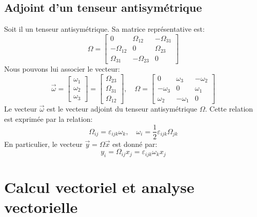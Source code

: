 \subsection{Adjoint d'un tenseur antisymétrique}
Soit il  un tenseur antisymétrique.
Sa matrice représentative est:
\begin{equation}
    \mathbb{\Omega} = 
    \begin{bmatrix}
        0 & \Omega_{12} & -\Omega_{31} \\
        -\Omega_{12} & 0 & \Omega_{23} \\
        \Omega_{31} & -\Omega_{23} & 0
    \end{bmatrix}
    \label{eq:AnnA-046}
\end{equation}
Nous pouvons lui associer le vecteur:
\begin{equation}
    \vec{\omega} = 
    \begin{bmatrix}
        \omega_1 \\
        \omega_2 \\
        \omega_3
    \end{bmatrix} =
    \begin{bmatrix}
        \Omega_{23} \\
        \Omega_{31} \\
        \Omega_{12}
    \end{bmatrix}, \quad
    \mathbb{\Omega} = 
    \begin{bmatrix}
        0 & \omega_3 &-\omega_2 \\
        -\omega_3 & 0 & \omega_1 \\
        \omega_2 & -\omega_1 & 0
    \end{bmatrix}
    \label{eq:AnnA-047}
\end{equation}
Le vecteur $\vec{\omega}$ est le vecteur adjoint du tenseur antisymétrique $\mathbb{\Omega}$.
Cette relation est exprimée par la relation:
\begin{equation}
        \Omega_{ij} = \varepsilon_{ijk} \omega_{k} ,\quad
        \omega_i = \frac{1}{2} \varepsilon_{ijk} \Omega_{jk}
    \label{eq:AnnA-048}
\end{equation}
En particulier, le vecteur $\vec{y} = \mathbb{\Omega} \vec{x}$ est donné par:
\begin{equation}
    y_i = \Omega_{ij} x_j = \varepsilon_{ijk} \omega_k x_j
    \label{eq:AnnA-049}
\end{equation}
\section{Calcul vectoriel et analyse vectorielle}
